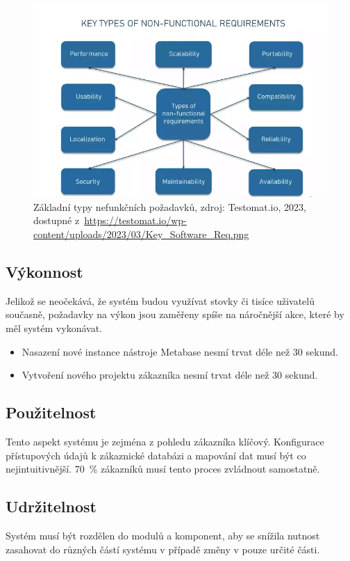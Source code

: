 \begin{figure}
    \centering
    \includegraphics[width=0.75\linewidth]{non-functional-req-types.png}
    \caption{Základní typy nefunkčních požadavků, zdroj: Testomat.io, 2023, dostupné z~\url{https://testomat.io/wp-content/uploads/2023/03/Key_Software_Req.png}}
    \label{fig:non-func-types}
\end{figure}

\subsection{Výkonnost}
Jelikož se neočekává, že systém budou využívat stovky či tisíce uživatelů současně, požadavky na výkon jsou zaměřeny spíše na náročnější akce, které by měl systém vykonávat.

\begin{itemize}
    \item Nasazení nové instance nástroje Metabase nesmí trvat déle než 30 sekund.
    \item Vytvoření nového projektu zákazníka nesmí trvat déle než 30 sekund.
\end{itemize}

\subsection{Použitelnost}

Tento aspekt systému je zejména z pohledu zákazníka klíčový.
Konfigurace přístupových údajů k zákaznické databázi a mapování dat musí být co nejintuitivnější. 70~\% zákazníků musí tento proces zvládnout samostatně.

\subsection{Udržitelnost}

Systém musí být rozdělen do modulů a komponent, aby se snížila nutnost zasahovat do různých částí systému v případě změny v pouze určité části.


